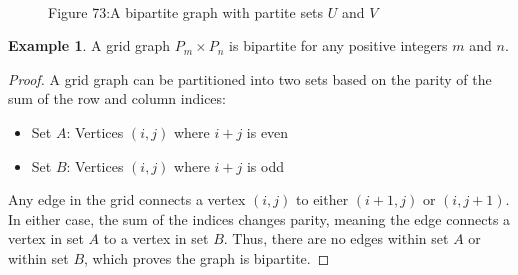 \documentclass{article}
\theoremstyle{definition}
\newtheorem{example}{Example}
\begin{document}
\begin{figure}[h]
\centering
{}
\\
\small Figure 73:A bipartite graph with partite sets $U$ and $V$
\end{figure}

\pagebreak
\newpage

\begin{example}
    
A grid graph $P_m \times P_n$ is bipartite for any positive integers $m$ and $n$.
\end{example}

\begin{proof}
A grid graph can be partitioned into two sets based on the parity of the sum of the row and column indices:
\begin{itemize}
    \item Set $A$: Vertices $(i,j)$ where $i + j$ is even
    \item Set $B$: Vertices $(i,j)$ where $i + j$ is odd
\end{itemize}

Any edge in the grid connects a vertex $(i,j)$ to either $(i+1,j)$ or $(i,j+1)$. In either case, the sum of the indices changes parity, meaning the edge connects a vertex in set $A$ to a vertex in set $B$. Thus, there are no edges within set $A$ or within set $B$, which proves the graph is bipartite.
\end{proof}
\end{document}
